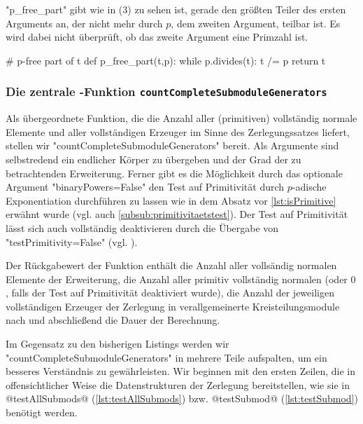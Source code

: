 "p_free_part" gibt wie in  (3) zu sehen ist,
gerade den größten Teiler des ersten Arguments an, der nicht mehr durch $p$,
dem zweiten Argument, teilbar ist. Es wird dabei nicht überprüft, ob das zweite
Argument eine Primzahl ist.


\begin{sagecode}[caption={Aus \url{../Sage/enumeratePCNs.spyx}},
  firstnumber=612]
# p-free part of t
def p_free_part(t,p):
    while p.divides(t):
        t /= p
    return t
\end{sagecode}


\subsubsection{Die zentrale \sage-Funktion 
  \texttt{countCompleteSubmoduleGenerators}}

Als übergeordnete Funktion, die die Anzahl aller (primitiven) vollständig
normale Elemente und aller vollständigen Erzeuger im Sinne des Zerlegungssatzes
liefert, stellen wir "countCompleteSubmoduleGenerators" bereit. Als Argumente
sind selbstredend ein endlicher Körper zu übergeben und der Grad der zu
betrachtenden Erweiterung. Ferner gibt es die Möglichkeit durch das optionale
Argument "binaryPowers=False" den Test auf Primitivität durch $p$-adische
Exponentiation durchführen zu lassen wie in dem Absatz vor 
\autoref{lst:isPrimitive} erwähnt wurde (vgl. auch 
\autoref{subsub:primitivitaetstest}). Der Test auf Primitivität lässt sich auch
vollständig deaktivieren durch die Übergabe von "testPrimitivity=False"
(vgl. ).

Der Rückgabewert der Funktion enthält die Anzahl aller vollsändig normalen
Elemente der Erweiterung, die Anzahl aller primitiv vollständig normalen (oder
$0$, falls der Test auf Primitivität deaktiviert wurde), 
die Anzahl der jeweiligen vollständigen Erzeuger der Zerlegung in
verallgemeinerte Kreisteilungsmodule nach  und
abschließend die Dauer der Berechnung.

Im Gegensatz zu den bisherigen Listings werden wir
"countCompleteSubmoduleGenerators" in mehrere Teile aufspalten, um ein besseres
Verständnis zu gewährleisten. Wir beginnen mit den ersten Zeilen, die in
offensichtlicher Weise die Datenstrukturen der Zerlegung bereitstellen, wie sie
in @testAllSubmods@ (\autoref{lst:testAllSubmods}) bzw. @testSubmod@ 
(\autoref{lst:testSubmod}) benötigt werden.


